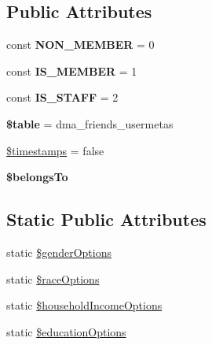 \subsection*{Public Attributes}
\begin{DoxyCompactItemize}
\item 
\hypertarget{classDMA_1_1Friends_1_1Models_1_1Usermeta_a3e0526daabd8785649e0755dbdf4ebae}{}const {\bfseries N\+O\+N\+\_\+\+M\+E\+M\+B\+E\+R} = 0\label{classDMA_1_1Friends_1_1Models_1_1Usermeta_a3e0526daabd8785649e0755dbdf4ebae}

\item 
\hypertarget{classDMA_1_1Friends_1_1Models_1_1Usermeta_aa5a492cddba999d3798f2d0c2340fad5}{}const {\bfseries I\+S\+\_\+\+M\+E\+M\+B\+E\+R} = 1\label{classDMA_1_1Friends_1_1Models_1_1Usermeta_aa5a492cddba999d3798f2d0c2340fad5}

\item 
\hypertarget{classDMA_1_1Friends_1_1Models_1_1Usermeta_a73c2b62b4d8e31f04c362931cf4fad77}{}const {\bfseries I\+S\+\_\+\+S\+T\+A\+F\+F} = 2\label{classDMA_1_1Friends_1_1Models_1_1Usermeta_a73c2b62b4d8e31f04c362931cf4fad77}

\item 
\hypertarget{classDMA_1_1Friends_1_1Models_1_1Usermeta_a7ca76640d4cd53c875648ec87d085f1d}{}{\bfseries \$table} = \textquotesingle{}dma\+\_\+friends\+\_\+usermetas\textquotesingle{}\label{classDMA_1_1Friends_1_1Models_1_1Usermeta_a7ca76640d4cd53c875648ec87d085f1d}

\item 
\hyperlink{classDMA_1_1Friends_1_1Models_1_1Usermeta_a085486010d2c88f8676ac2e4fdbc257d}{\$timestamps} = false
\item 
{\bfseries \$belongs\+To}
\end{DoxyCompactItemize}
\subsection*{Static Public Attributes}
\begin{DoxyCompactItemize}
\item 
static \hyperlink{classDMA_1_1Friends_1_1Models_1_1Usermeta_a85cf8b9b7dd2582d64ac9e130dd0069d}{\$gender\+Options}
\item 
static \hyperlink{classDMA_1_1Friends_1_1Models_1_1Usermeta_adcfe27bcb392a9cdab20c59e612a0d7a}{\$race\+Options}
\item 
static \hyperlink{classDMA_1_1Friends_1_1Models_1_1Usermeta_a0578ccf8e50b07c1a6ec66118671d7a3}{\$household\+Income\+Options}
\item 
static \hyperlink{classDMA_1_1Friends_1_1Models_1_1Usermeta_a2d958b56be7414a58e8db11ce8b636ae}{\$education\+Options}
\end{DoxyCompactItemize}
